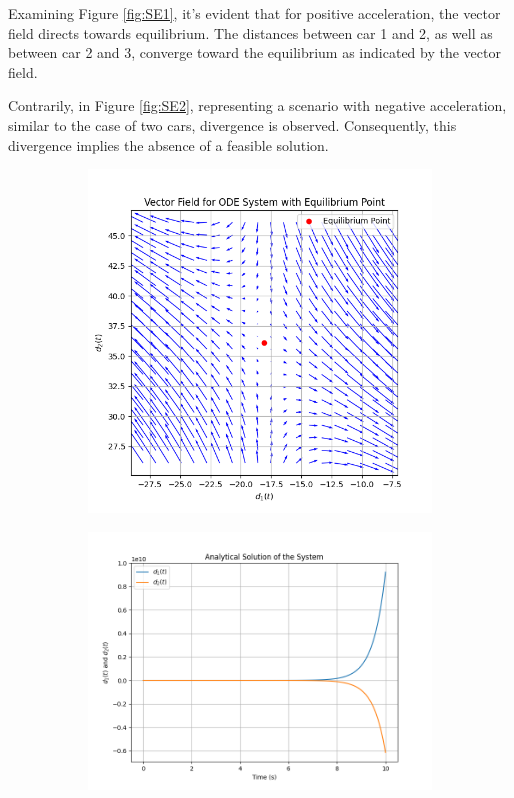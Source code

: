 \documentclass{article}
\begin{document}
		Examining Figure \ref{fig:SE1}, it's evident that for positive acceleration, the vector field directs towards equilibrium. The distances between car 1 and 2, as well as between car 2 and 3, converge toward the equilibrium as indicated by the vector field.
		
		Contrarily, in Figure \ref{fig:SE2}, representing a scenario with negative acceleration, similar to the case of two cars, divergence is observed. Consequently, this divergence implies the absence of a feasible solution.
		
		\begin{figure}[H]
			\centering
			\begin{subfigure}{0.45\textwidth}
				\centering
				\includegraphics[width=\linewidth]{FieldOfVector_DV2.png}
			\end{subfigure}
			\hfill
			\begin{subfigure}{0.45\textwidth}
				\centering
				\includegraphics[width=\linewidth]{AnalyticalSolution2.png}

\end{subfigure}
\end{figure}
\end{document}
